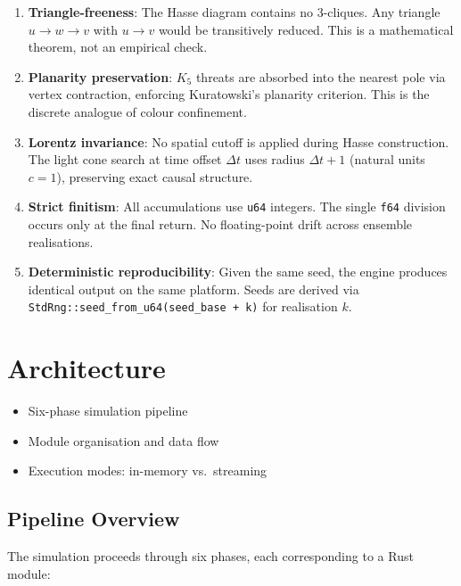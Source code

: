 \documentclass[11pt, a4paper, openany]{book}
\newcommand{\code}[1]{\texttt{#1}}
\newenvironment{introduction}[1][Chapter Overview]{%
  \begin{tcolorbox}[
    enhanced,colback=structure!5,colframe=structure,
    colbacktitle=structure,coltitle=white,
    fonttitle=\small\bfseries,title={#1},
    arc=2pt,boxrule=0.7pt,
    left=8pt,right=8pt,top=6pt,bottom=6pt,
    before skip=12pt,after skip=12pt
  ]\itshape\begin{itemize}[leftmargin=*,itemsep=2pt,parsep=0pt]
}{%
  \end{itemize}\end{tcolorbox}
}
\begin{document}
\begin{enumerate}
  \item \textbf{Triangle-freeness}: The Hasse diagram contains no 3-cliques.
        Any triangle $u \to w \to v$ with $u \to v$ would be transitively
        reduced.  This is a mathematical theorem, not an empirical check.
  \item \textbf{Planarity preservation}: $K_5$ threats are absorbed into the
        nearest pole via vertex contraction, enforcing Kuratowski's planarity
        criterion.  This is the discrete analogue of colour confinement.
  \item \textbf{Lorentz invariance}: No spatial cutoff is applied during Hasse
        construction.  The light cone search at time offset $\Delta t$ uses
        radius $\Delta t + 1$ (natural units $c = 1$), preserving exact
        causal structure.
  \item \textbf{Strict finitism}: All accumulations use \code{u64} integers.
        The single \code{f64} division occurs only at the final return.
        No floating-point drift across ensemble realisations.
  \item \textbf{Deterministic reproducibility}: Given the same seed, the engine
        produces identical output on the same platform.  Seeds are derived via
        \code{StdRng::seed\_from\_u64(seed\_base + k)} for realisation $k$.
\end{enumerate}


\chapter{Architecture}

\begin{introduction}
  \item Six-phase simulation pipeline
  \item Module organisation and data flow
  \item Execution modes: in-memory vs.\ streaming
\end{introduction}

\section{Pipeline Overview}

The simulation proceeds through six phases, each corresponding to a Rust module:
\end{document}
